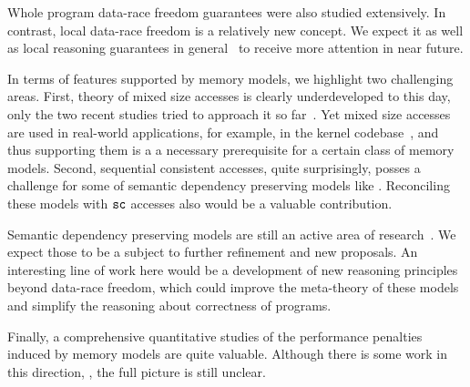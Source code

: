 Whole program data-race freedom guarantees were also studied extensively.
In contrast, local data-race freedom is a relatively new concept. 
We expect it as well as local reasoning guarantees 
in general~\cite{Dodds-al:ESOP18, Jagadeesan-al:OOPSLA2020, Cho-al:PLDI21} 
to receive more attention in near future.  

In terms of features supported by memory models, 
we highlight two challenging areas.
First, theory of mixed size accesses is clearly 
underdeveloped to this day, only the two recent studies 
tried to approach it so far~\cite{Flur-al:POPL17, Watt-al:PLDI2020}.
Yet mixed size accesses are used in real-world applications,
for example, in the \Linux kernel codebase~\cite{Flur-al:POPL17},
and thus supporting them is a a necessary prerequisite 
for a certain class of memory models. 
Second, sequential consistent accesses, quite surprisingly,
posses a challenge for some of semantic dependency preserving
models like \Promising. Reconciling these models with ${\mathtt{sc}}$ 
accesses also would be a valuable contribution.

Semantic dependency preserving models are still an active 
area of research~\cite{Kang-al:POPL17, Lee-al:PLDI20, Cho-al:PLDI21,
Chakraborty-Vafeiadis:POPL19, Paviotti-al:ESOP20, 
Jagadeesan-al:OOPSLA2020}. 
We expect those to be a subject to 
further refinement and new proposals. 
An interesting line of work here would be 
a development of new reasoning principles
beyond data-race freedom, which could 
improve the meta-theory of these models and 
simplify the reasoning about correctness of programs.   

Finally, a comprehensive quantitative studies 
of the performance penalties induced by memory models are quite valuable.
Although there is some work in this direction,%
\cite{Singh-al:ISCA12, Liu-al:OOPSLA17, Liu-al:PLDI19, 
Vollmer-al:PPoPP17, Dolan-al:PLDI18, Ou-Demsky:OOPSLA18}, 
the full picture is still unclear.
